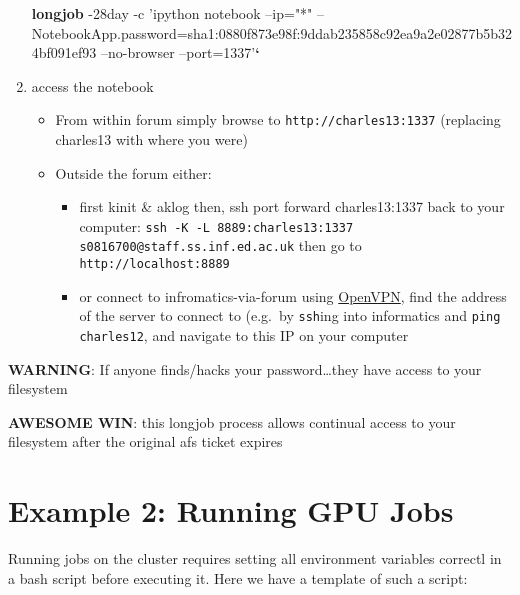 \documentclass[]{article}
\newenvironment{Shaded}{\begin{snugshade}}{\end{snugshade}}
\newcommand{\KeywordTok}[1]{\textcolor[rgb]{0.13,0.29,0.53}{\textbf{{#1}}}}
\newcommand{\StringTok}[1]{\textcolor[rgb]{0.31,0.60,0.02}{{#1}}}
\newcommand{\NormalTok}[1]{{#1}}
\begin{document}
\begin{enumerate}
\begin{Shaded}
\begin{Highlighting}[]
\KeywordTok{longjob} \NormalTok{-28day -c }\StringTok{'ipython notebook  --ip="*" --NotebookApp.password=sha1:0880f873e98f:9ddab235858c92ea9a2e02877b5b324bf091ef93 --no-browser --port=1337'}\KeywordTok{`}
\end{Highlighting}
\end{Shaded}
\item
  access the notebook

  \begin{itemize}
  \itemsep1pt\parskip0pt
  \item
    From within forum simply browse to \texttt{http://charles13:1337}
    (replacing charles13 with where you were)
  \item
    Outside the forum either:

    \begin{itemize}
    \itemsep1pt\parskip0pt
    \item
      first kinit \& aklog then, ssh port forward charles13:1337 back to
      your computer:
      \texttt{ssh -K -L 8889:charles13:1337 s0816700@staff.ss.inf.ed.ac.uk}
      then go to \texttt{http://localhost:8889}
    \item
      or connect to infromatics-via-forum using
      \href{http://computing.help.inf.ed.ac.uk/openvpn}{OpenVPN}, find
      the address of the server to connect to (e.g.~by \texttt{ssh}ing
      into informatics and \texttt{ping charles12}, and navigate to this
      IP on your computer
    \end{itemize}
  \end{itemize}
\end{enumerate}

{\textbf{WARNING}}: If anyone finds/hacks your password\ldots{}they have
access to your filesystem

\textbf{AWESOME WIN}: this longjob process allows continual access to
your filesystem after the original afs ticket expires

\section{Example 2: Running GPU Jobs}\label{example-2-running-gpu-jobs}

Running jobs on the cluster requires setting all environment variables
correctl in a bash script before executing it. Here we have a template
of such a script:
\end{document}
